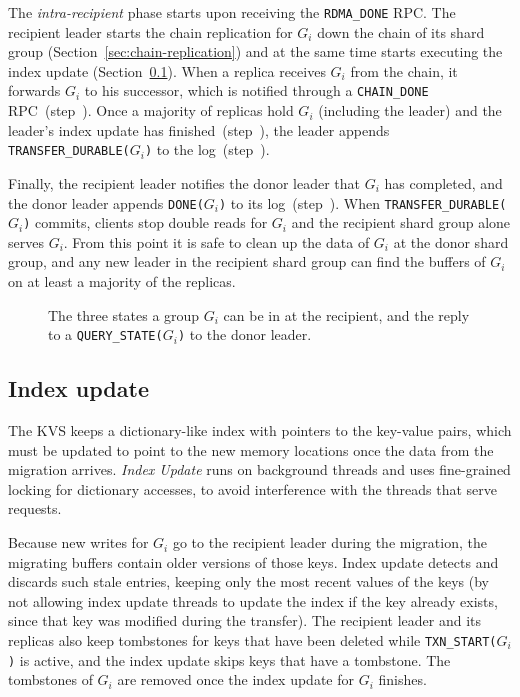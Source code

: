 The \emph{intra-recipient} phase starts upon receiving the \texttt{RDMA\_DONE} RPC.
The recipient leader starts the chain replication for $G_i$ down the chain of its shard group (Section~\ref{sec:chain-replication}) and at the same time starts executing the index update (Section~\ref{sec:index_updating}).
When a replica receives $G_i$ from the chain, it forwards $G_i$ to his successor, which is notified through a \texttt{CHAIN\_DONE} RPC~(step~).
Once a majority of replicas hold $G_i$ (including the leader) and the leader's index update has finished~(step~), the leader appends \texttt{TRANSFER\_DURABLE($G_i$)} to the log~(step~).

Finally, the recipient leader notifies the donor leader that $G_i$ has completed, and the donor leader appends \texttt{DONE($G_i$)} to its log~(step~).
When \texttt{TRANSFER\_DURABLE($G_i$)} commits, clients stop double reads for $G_i$ and the recipient shard group alone serves $G_i$.
From this point it is safe to clean up the data of $G_i$ at the donor shard group, and any new leader in the recipient shard group can find the buffers of $G_i$ on at least a majority of the replicas.

\begin{figure}[t]
  \centering
  \resizebox{0.9\columnwidth}{!}{}
  \caption{The three states a group $G_i$ can be in at the recipient, and the reply to a \texttt{QUERY\_STATE($G_i$)} to the donor leader.}
  \label{fig:query_state}
\end{figure}

\subsection{Index update}
\label{sec:index_updating}

The KVS keeps a dictionary-like index with pointers to the key-value pairs, which must be updated to point to the new memory locations once the data from the migration arrives.
\emph{Index Update} runs on background threads and uses fine-grained locking for dictionary accesses, to avoid interference with the threads that serve requests.

Because new writes for $G_i$ go to the recipient leader during the migration, the migrating buffers contain older versions of those keys.
Index update detects and discards such stale entries, keeping only the most recent values of the keys (by not allowing index update threads to update the index if the key already exists, since that key was modified during the transfer).
The recipient leader and its replicas also keep tombstones for keys that have been deleted while \texttt{TXN\_START($G_i$)} is active, and the index update skips keys that have a tombstone.
The tombstones of $G_i$ are removed once the index update for $G_i$ finishes.

